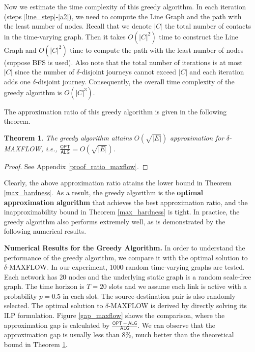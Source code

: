 \documentclass[10pt, conference, letterpaper]{IEEEtran}
\newtheorem{theorem}{Theorem}
\begin{document}
Now we estimate the time complexity of this greedy algorithm. In each iteration (steps \ref{line_step}-\ref{a2}), we need to compute the Line Graph and the path with the least number of nodes. Recall that we denote $|C|$ the total number of contacts in the time-varying graph. Then it takes $O(|C|^2)$ time to construct the Line Graph and $O(|C|^2)$ time to compute the path with the least number of nodes (suppose BFS is used). Also note that the total number of iterations is at most $|C|$ since the number of $\delta$-disjoint journeys cannot exceed $|C|$ and each iteration adds one $\delta$-disjoint journey. Consequently, the overall time complexity of the greedy algorithm is $O(|C|^3)$.

The approximation ratio of this greedy algorithm is given in the following theorem.


\begin{theorem}\label{ratio_maxflow}
The greedy algorithm  attains $O(\sqrt{|E|})$ approximation for $\delta$-MAXFLOW, i.e., $\frac{\mathsf{OPT}}{\mathsf{ALG}}=O(\sqrt{|E|})$.
\end{theorem}
\begin{proof}
See Appendix \ref{proof_ratio_maxflow}.
\end{proof}

\noindent Clearly, the above approximation ratio attains the lower bound in Theorem \ref{max_hardness}. As a result, the greedy algorithm is the \textbf{optimal approximation algorithm} that achieves the best approximation ratio, and the inapproximability bound in Theorem \ref{max_hardness} is tight. In practice, the greedy algorithm also performs extremely well, as is demonstrated by the following numerical results.

\vspace{1mm}

\noindent \textbf{Numerical Results for the Greedy Algorithm.} In order to understand the performance of the greedy algorithm, we compare it with the optimal solution to $\delta$-MAXFLOW. In our experiment, 1000 random time-varying graphs are tested. Each network has 20 nodes and the underlying static graph is a random scale-free graph. The time horizon is $T=20$ slots and we assume each link is active with a probability $p=0.5$ in each slot. The source-destination pair is also randomly selected. The optimal solution to $\delta$-MAXFLOW is derived by directly solving its ILP formulation. Figure \ref{gap_maxflow} shows the comparison, where the approximation gap is calculated by $\frac{\mathsf{OPT}-\mathsf{ALG}}{\mathsf{ALG}}$. We can observe that the approximation gap is usually less than 8\%, much better than the theoretical bound in Theorem \ref{ratio_maxflow}.
\end{document}
